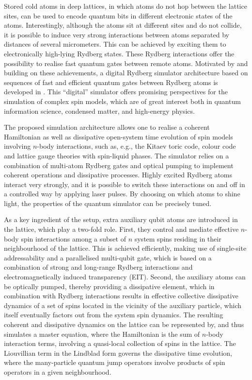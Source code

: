 \documentclass[epj,final]{svjour}
\begin{document}
Stored cold atoms in deep lattices, in which atoms do not hop between the lattice sites, can be used to encode quantum bits in different electronic states of the atoms. Interestingly, although the atoms sit at different sites and do not collide, it is possible to induce very strong interactions between atoms separated by distances of several micrometers. This can be achieved by exciting them to electronically high-lying Rydberg states. These Rydberg interactions offer the possibility to realise fast quantum gates between remote atoms. Motivated by and building on these achievements, a digital Rydberg simulator architecture based on sequences of fast and efficient quantum gates between Rydberg atoms is developed in \cite{weimer2010rydberg}. This ``digital'' simulator offers promising perspectives for the simulation of complex spin models, which are of great interest both in quantum information science, condensed matter, and high-energy physics.

The proposed simulation architecture allows one to realise a coherent Hamiltonian as well as dissipative open-system time evolution of spin models involving $n$-body interactions, such as, e.g., the Kitaev toric code, colour code and lattice gauge theories with spin-liquid phases. The simulator relies on a combination of multi-atom Rydberg gates and optical pumping to implement coherent operations and dissipative processes. Highly excited Rydberg atoms interact very strongly, and it is possible to switch these interactions on and off in a controlled way by applying laser pulses. By choosing on which atoms to shine light, the properties of the quantum simulator can be precisely tuned.

As a key ingredient of the setup, extra auxiliary qubit atoms are introduced in the lattice, which play a two-fold role. First, they control and mediate effective $n$-body spin interactions among a subset of $n$ system spins residing in their neighbourhood of the lattice. This is achieved efficiently, making use of single-site addressability and a parallelised multi-qubit gate, which is based on a combination of strong and long-range Rydberg interactions and electromagnetically induced transparency (EIT). Second, the auxiliary atoms can be optically pumped, thereby providing a dissipative element, which in combination with Rydberg interactions results in effective collective dissipative dynamics of a set of spins located in the vicinity of the auxiliary particle, which itself eventually factors out from the system spin dynamics. The resulting coherent and dissipative dynamics on the lattice can be represented by, and thus simulates a master equation, where the Hamiltonian is the sum of $n$-body interaction terms, involving a quasi-local collection of spins in the lattice. The Liouvillian term in the Lindblad form governs the dissipative time evolution, where the many-particle quantum jump operators involve products of spin operators in a given neighbourhood.
\end{document}

